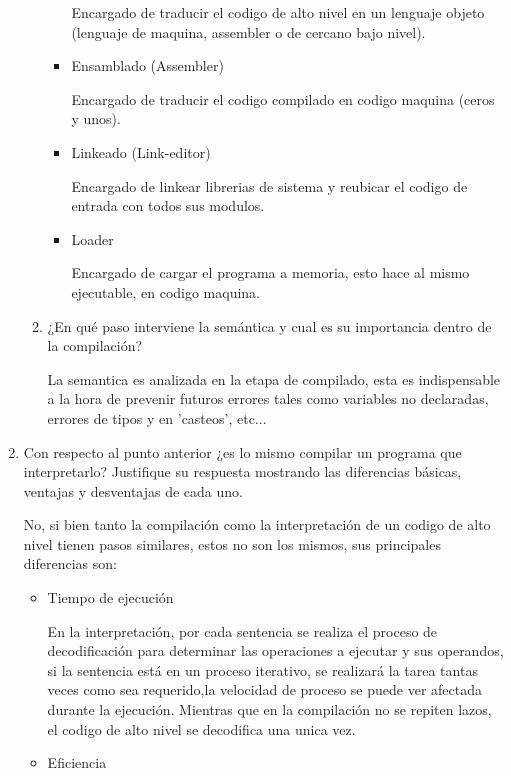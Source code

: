 \documentclass[a4paper,10pt]{article}
\begin{document}
\begin{enumerate}
\begin{enumerate}
\begin{itemize}
Encargado de traducir el codigo de alto nivel en un lenguaje objeto (lenguaje de maquina, assembler o de cercano bajo nivel).

\item Ensamblado (Assembler)

Encargado de traducir el codigo compilado en codigo maquina (ceros y unos).

\item Linkeado (Link-editor)

Encargado de linkear librerias de sistema y reubicar el codigo de entrada con todos sus modulos.

\item Loader

Encargado de cargar el programa a memoria, esto hace al mismo ejecutable, en codigo maquina.

\end{itemize}

\item ¿En qué paso interviene la semántica y cual es su importancia dentro de la compilación?

La semantica es analizada en la etapa de compilado, esta es indispensable a la hora de prevenir futuros errores tales como variables no declaradas, errores de tipos y en 'casteos', etc...

\end{enumerate}

\item Con respecto al punto anterior ¿es lo mismo compilar un programa que interpretarlo? Justifique su respuesta mostrando las diferencias básicas, ventajas y desventajas de cada uno.

No, si bien tanto la compilación como la interpretación de un codigo de alto nivel tienen pasos similares, estos no son los mismos, sus principales diferencias son:

\begin{itemize}
\item Tiempo de ejecución

En la interpretación, por cada sentencia se realiza el proceso de decodificación para determinar las operaciones a ejecutar y sus operandos, si la sentencia está en un proceso iterativo, se realizará la tarea tantas veces como sea requerido,la velocidad de proceso se puede ver afectada durante la ejecución. Mientras que en la compilación no se repiten lazos, el codigo de alto nivel se decodifica una unica vez.

\item Eficiencia


\end{itemize}
\end{enumerate}
\end{document}
